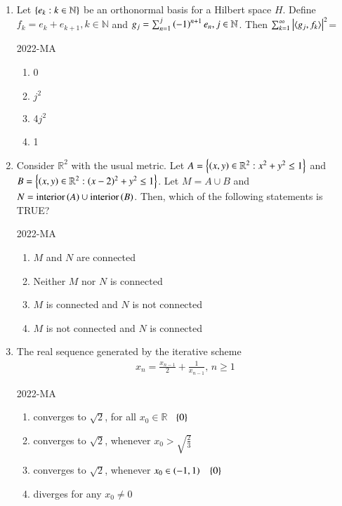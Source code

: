 \documentclass[journal,12pt,onecolumn]{IEEEtran}
\theoremstyle{remark}
\begin{document}
\begin{enumerate}
\item Let $\left\{e_k : k \in \mathbb{N}\right\}$ be an orthonormal basis for a Hilbert space $H$. Define $f_k = e_k +e_{k+1}, k\in \mathbb{N}$ and $g_j = \sum^{j} _{n=1} \left(-1\right)^{n+1} e_n, j \in \mathbb{N}$. Then $\sum _{k=1} ^{\infty} \left\vert\langle g_j, f_k \rangle\right\vert^{2}$=
	
	\hfill{2022-MA}

	 \begin{enumerate}
		\item 0
		\item $j^2$
		\item 4$j^2$
		\item 1
	 \end{enumerate}

 \item Consider $\mathbb{R}^2$ with the usual metric. Let $A=\left\{\left(x,y\right) \in \mathbb{R}^2 : x^2+y^2 \leq 1\right\}$ and $B=\left\{\left(x,y\right) \in \mathbb{R}^2 : (x-2)^2+y^2 \leq 1\right\}$. Let $M=A \cup B$ and $N=\text{interior}\left(A\right) \cup \text{interior}\left(B\right)$. Then, which of the following statements is TRUE?
	 
	 \hfill{2022-MA}

	 \begin{enumerate}
		\item $M$ and $N$ are connected
		\item Neither $M$ nor $N$ is connected
		\item $M$ is connected and $N$ is not connected
		\item $M$ is not connected and $N$ is connected
	\end{enumerate}

\item The real sequence generated by the iterative scheme
	\begin{align*}
		x_n=\frac{x_{n-1}}{2}+\frac{1}{x_{n-1}}, \, n\geq 1
	\end{align*}
	
	\hfill{2022-MA}

 	
	\begin{enumerate}
		\item converges to $\sqrt{2}$, for all $x_0 \in \mathbb{R}$ \ $\left\{0\right\}$
		\item converges to $\sqrt{2}$, whenever $x_0 > \sqrt{\frac{2}{3}}$
		\item converges to $\sqrt{2}$, whenever $x_0 \in \left(-1,1\right)$ \ $\left\{0\right\}$
		\item diverges for any $x_0 \neq 0$
	\end{enumerate}


\end{enumerate}
\end{document}
